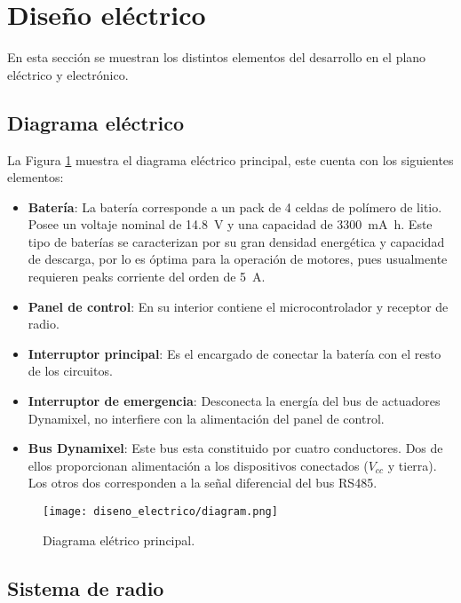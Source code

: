 \section{Diseño eléctrico}

En esta sección se muestran los distintos elementos del desarrollo en el plano eléctrico y electrónico.

\subsection{Diagrama eléctrico}

La Figura \ref{de_diagrama} muestra el diagrama eléctrico principal, este cuenta con los siguientes elementos:
\begin{itemize}
    \item \textbf{Batería}: La batería corresponde a un pack de 4 celdas de polímero de litio. Posee un voltaje nominal de \SI{14.8}{\volt} y una capacidad de \SI{3300}{\milli\ampere\hour}. Este tipo de baterías se caracterizan por su gran densidad energética y capacidad de descarga, por lo es óptima para la operación de motores, pues usualmente requieren peaks corriente del orden de \SI{5}{\ampere}.
    \item \textbf{Panel de control}: En su interior contiene el microcontrolador y receptor de radio.
    \item \textbf{Interruptor principal}: Es el encargado de conectar la batería con el resto de los circuitos.
    \item \textbf{Interruptor de emergencia}: Desconecta la energía del bus de actuadores Dynamixel, no interfiere con la alimentación del panel de control.
    \item \textbf{Bus Dynamixel}: Este bus esta constituido por cuatro conductores. Dos de ellos proporcionan alimentación a los dispositivos conectados ($V_{cc}$ y tierra). Los otros dos corresponden a la señal diferencial del bus RS485.
\end{itemize}

\begin{figure}[H]
\begin{center}
	\texttt{[image: diseno\_electrico/diagram.png]}
	\caption{Diagrama elétrico principal.}
	\label{de_diagrama}
\end{center}
\end{figure}

\subsection{Sistema de radio}

